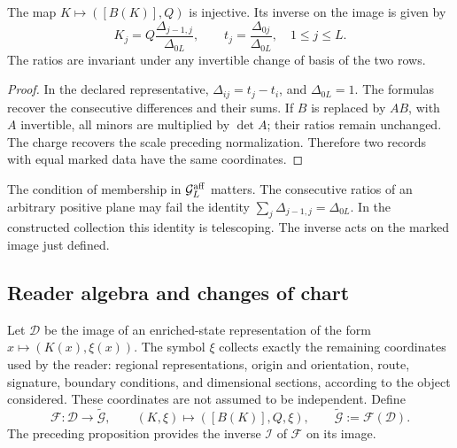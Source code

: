 \begin{proposition}
\label{prop:compat-inversa-marcada}
The map \(K\mapsto([B(K)],Q)\) is injective. Its inverse
on the image is given by
\begin{equation}
 K_j=Q\frac{\Delta_{j-1,j}}{\Delta_{0L}},
 \qquad
 t_j=\frac{\Delta_{0j}}{\Delta_{0L}},
 \quad 1\leq j\leq L.
 \label{eq:compat-inversa-plucker}
\end{equation}
The ratios are invariant under any invertible change of basis
of the two rows.
\end{proposition}
\begin{proof}
In the declared representative,
\(\Delta_{ij}=t_j-t_i\), and \(\Delta_{0L}=1\).
The formulas recover the consecutive differences and their sums.
If \(B\) is replaced by \(AB\), with \(A\) invertible,
all minors are multiplied by \(\det A\); their ratios
remain unchanged. The charge recovers the scale preceding
normalization. Therefore two records with equal marked data
have the same coordinates.
\end{proof}

The condition of membership in \(\mathcal G_L^{\rm aff}\) matters.
The consecutive ratios of an arbitrary positive plane may
fail the identity \(\sum_j\Delta_{j-1,j}=\Delta_{0L}\).
In the constructed collection this identity is telescoping. The inverse acts
on the marked image just defined.

\subsection{Reader algebra and changes of chart}

Let \(\mathcal D\) be the image of an enriched-state representation
of the form \(x\mapsto(K(x),\xi(x))\). The symbol \(\xi\)
collects exactly the remaining coordinates used by the reader:
regional representations, origin and orientation, route, signature, boundary
conditions, and dimensional sections, according to the object considered.
These coordinates are not assumed to be independent. Define
\[
 \mathcal F:\mathcal D\longrightarrow\widetilde{\mathcal G},
 \qquad (K,\xi)\longmapsto([B(K)],Q,\xi),
 \qquad \widetilde{\mathcal G}:=\mathcal F(\mathcal D).
\]
The preceding proposition provides the inverse \(\mathcal I\) of
\(\mathcal F\) on its image.

